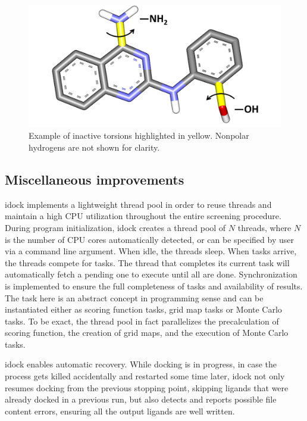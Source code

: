 \begin{figure}
\centering
\includegraphics[width=\linewidth]{../idock/InactiveTorsions.png}
\caption{Example of inactive torsions highlighted in yellow. Nonpolar hydrogens are not shown for clarity.}
\label{idock:InactiveTorsions}
\end{figure}

\subsection{Miscellaneous improvements}

idock implements a lightweight thread pool in order to reuse threads and maintain a high CPU utilization throughout the entire screening procedure. During program initialization, idock creates a thread pool of $N$ threads, where $N$ is the number of CPU cores automatically detected, or can be specified by user via a command line argument. When idle, the threads sleep. When tasks arrive, the threads compete for tasks. The thread that completes its current task will automatically fetch a pending one to execute until all are done. Synchronization is implemented to ensure the full completeness of tasks and availability of results. The task here is an abstract concept in programming sense and can be instantiated either as scoring function tasks, grid map tasks or Monte Carlo tasks. To be exact, the thread pool in fact parallelizes the precalculation of scoring function, the creation of grid maps, and the execution of Monte Carlo tasks.

idock enables automatic recovery. While docking is in progress, in case the process gets killed accidentally and restarted some time later, idock not only resumes docking from the previous stopping point, skipping ligands that were already docked in a previous run, but also detects and reports possible file content errors, ensuring all the output ligands are well written.

